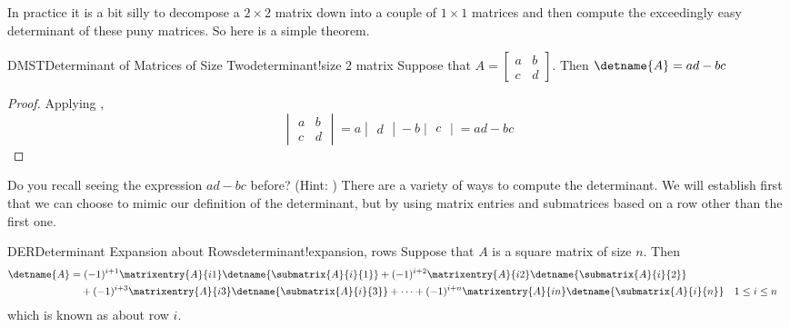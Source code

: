 In practice it is a bit silly to decompose a $2\times 2$ matrix down into a couple of $1\times 1$ matrices and then compute the exceedingly easy determinant of these puny matrices.  So here is a simple theorem.
%
\begin{theorem}{DMST}{Determinant of Matrices of Size Two}{determinant!size 2 matrix}
Suppose that $A=\begin{bmatrix}a&b\\c&d\end{bmatrix}$.  Then $\detname{A}=ad-bc$
\end{theorem}
%
\begin{proof}
Applying ,
%
\begin{equation*}
\begin{vmatrix}
a&b\\c&d
\end{vmatrix}=
a\begin{vmatrix}d\end{vmatrix}-b\begin{vmatrix}c\end{vmatrix}=ad-bc
\end{equation*}
%
\end{proof}
%
Do you recall seeing the expression $ad-bc$ before?  (Hint:  )
%
%
There are a variety of ways to compute the determinant.  We will establish first that we can choose to mimic our definition of the determinant, but by using matrix entries and submatrices based on a row other than the first one.
%
\begin{theorem}{DER}{Determinant Expansion about Rows}{determinant!expansion, rows}
Suppose that $A$ is a square matrix of size $n$.  Then
%
\begin{align*}
\detname{A}&=
(-1)^{i+1}\matrixentry{A}{i1}\detname{\submatrix{A}{i}{1}}+
(-1)^{i+2}\matrixentry{A}{i2}\detname{\submatrix{A}{i}{2}}\\
&\quad+(-1)^{i+3}\matrixentry{A}{i3}\detname{\submatrix{A}{i}{3}}+
\cdots+
(-1)^{i+n}\matrixentry{A}{in}\detname{\submatrix{A}{i}{n}}
&&
1\leq i\leq n
%
\end{align*}
%
which is known as  about row $i$.
%
\end{theorem}
%
